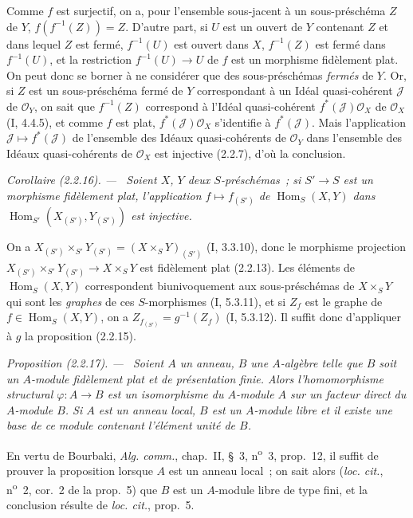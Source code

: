 \documentclass[10pt,oneside]{book}
\newcommand{\oldpage}[2][]{%
  \setcounter{footnote}{0}%
  \marginpar{\scriptsize\textbf{#1}~|~#2}\ignorespaces}
\newenvironment{proposition}[1][]{%
  \par\medskip\noindent\itshape Proposition (#1). ---\ }{\par}
\newenvironment{corollary}[1][]{%
  \par\medskip\noindent\itshape Corollaire (#1). ---\ }{\par}
\begin{document}
Comme $f$ est surjectif, on a, pour l'ensemble sous-jacent à un
sous-préschéma $Z$ de $Y$, $f(f^{-1}(Z))=Z$. D'autre part, si $U$ est un
ouvert de $Y$ contenant $Z$ et dans lequel $Z$ est fermé, $f^{-1}(U)$ est
ouvert dans $X$, $f^{-1}(Z)$ est fermé dans $f^{-1}(U)$, et la restriction
$f^{-1}(U)\to U$ de $f$ est un morphisme fidèlement plat. On peut donc se
borner à ne considérer que des sous-préschémas \emph{fermés} de $Y$. Or, si
$Z$ est un sous-préschéma fermé de $Y$ correspondant à un Idéal
quasi-cohérent $\mathscr J$ de $\mathcal O_Y$, on sait que $f^{-1}(Z)$
correspond à l'Idéal quasi-cohérent $f^*(\mathscr J)\mathcal O_X$ de
$\mathcal O_X$ (I, 4.4.5), et comme $f$ est plat,
$f^*(\mathscr J)\mathcal O_X$ s'identifie à $f^*(\mathscr J)$. Mais
l'application $\mathscr J\mapsto f^*(\mathscr J)$ de l'ensemble des Idéaux
quasi-cohérents de $\mathcal O_Y$ dans l'ensemble des Idéaux quasi-cohérents
de $\mathcal O_X$ est injective (2.2.7), d'où la conclusion.

\begin{corollary}[2.2.16]
\label{IV.2.2.16-fr}
Soient $X$, $Y$ deux $S$-préschémas~; si $S'\to S$ est un morphisme
fidèlement plat, l'application $f\mapsto f_{(S')}$ de
$\operatorname{Hom}_S(X,Y)$ dans
$\operatorname{Hom}_{S'}(X_{(S')},Y_{(S')})$ est injective.
\end{corollary}

On a $X_{(S')}\times_{S'}Y_{(S')}=(X\times_S Y)_{(S')}$ (I, 3.3.10), donc le
morphisme projection
$X_{(S')}\times_{S'}Y_{(S')}\to X\times_S Y$ est fidèlement plat (2.2.13).
Les éléments de $\operatorname{Hom}_S(X,Y)$ correspondent biunivoquement aux
sous-préschémas de $X\times_S Y$ qui sont les \emph{graphes} de ces
$S$-morphismes (I, 5.3.11), et si $Z_f$ est le graphe de
$f\in\operatorname{Hom}_S(X,Y)$, on a $Z_{f_{(S')}}=g^{-1}(Z_f)$ (I, 5.3.12).
Il suffit donc d'appliquer à $g$ la proposition (2.2.15).

\begin{proposition}[2.2.17]
\label{IV.2.2.17-fr}
Soient $A$ un anneau, $B$ une $A$-algèbre telle que $B$ soit un $A$-module
fidèlement plat et de présentation finie. Alors l'homomorphisme structural
$\varphi:A\to B$ est un isomorphisme du $A$-module $A$ sur un \emph{facteur
direct} du $A$-module $B$. Si $A$ est un anneau local, $B$ est un $A$-module
libre et il existe une base de ce module contenant l'élément unité de $B$.
\end{proposition}

\oldpage[IV-2]{14}
En vertu de Bourbaki, \emph{Alg. comm.}, chap.~II, \S~3,
n\textsuperscript{o}~3, prop.~12, il suffit de prouver la proposition lorsque
$A$ est un anneau local~; on sait alors (\emph{loc. cit.},
n\textsuperscript{o}~2, cor.~2 de la prop.~5) que $B$ est un $A$-module libre
de type fini, et la conclusion résulte de \emph{loc. cit.}, prop.~5.
\end{document}
